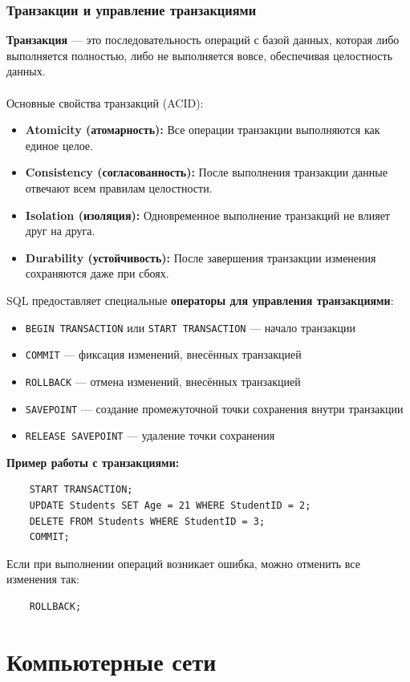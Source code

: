 \documentclass[a4paper, 12pt]{report}
\numberwithin{equation}{section}
\begin{document}
\subsection*{Транзакции и управление транзакциями}
\textbf{Транзакция} --- это последовательность операций с базой данных, которая либо выполняется полностью, либо не выполняется вовсе, обеспечивая целостность данных.
\\\\
Основные свойства транзакций (ACID):
\begin{itemize}
	\item \textbf{Atomicity (атомарность):} Все операции транзакции выполняются как единое целое.
	\item \textbf{Consistency (согласованность):} После выполнения транзакции данные отвечают всем правилам целостности.
	\item \textbf{Isolation (изоляция):} Одновременное выполнение транзакций не влияет друг на друга.
	\item \textbf{Durability (устойчивость):} После завершения транзакции изменения сохраняются даже при сбоях.
\end{itemize}
SQL предоставляет специальные \textbf{операторы для управления транзакциями}:
\begin{itemize}
	\item \texttt{BEGIN TRANSACTION} или \texttt{START TRANSACTION} --- начало транзакции
	\item \texttt{COMMIT} --- фиксация изменений, внесённых транзакцией
	\item \texttt{ROLLBACK} --- отмена изменений, внесённых транзакцией
	\item \texttt{SAVEPOINT} --- создание промежуточной точки сохранения внутри транзакции
	\item \texttt{RELEASE SAVEPOINT} --- удаление точки сохранения
\end{itemize}
\textbf{Пример работы с транзакциями:}
\begin{verbatim}
	START TRANSACTION;
	UPDATE Students SET Age = 21 WHERE StudentID = 2;
	DELETE FROM Students WHERE StudentID = 3;
	COMMIT;
\end{verbatim}
Если при выполнении операций возникает ошибка, можно отменить все изменения так:
\begin{verbatim}
	ROLLBACK;
\end{verbatim}
\chapter{Компьютерные сети}
\end{document}
